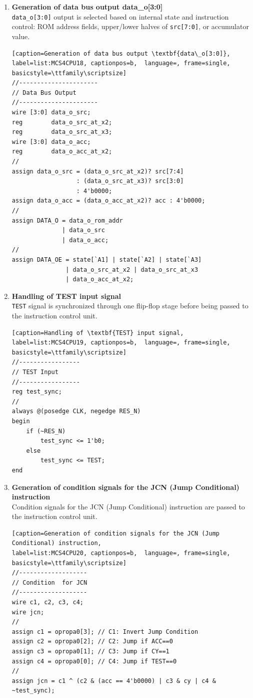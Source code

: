 \begin{enumerate}[(1)]
\item \textbf{Generation of data bus output \textbf{data\_o[3:0]}}\\
\verb|data_o[3:0]| output is selected based on internal state and instruction control: ROM address fields, upper/lower halves of \verb|src[7:0]|, or accumulator value.
\\
\begin{lstlisting}[caption=Generation of data bus output \textbf{data\_o[3:0]}, 
label=list:MCS4CPU18, captionpos=b,  language=, frame=single, basicstyle=\ttfamily\scriptsize]
//----------------------
// Data Bus Output
//----------------------
wire [3:0] data_o_src;
reg        data_o_src_at_x2;
reg        data_o_src_at_x3;
wire [3:0] data_o_acc;
reg        data_o_acc_at_x2;
//
assign data_o_src = (data_o_src_at_x2)? src[7:4]
                  : (data_o_src_at_x3)? src[3:0]
                  : 4'b0000;
assign data_o_acc = (data_o_acc_at_x2)? acc : 4'b0000;
//
assign DATA_O = data_o_rom_addr
              | data_o_src
              | data_o_acc;
//
assign DATA_OE = state[`A1] | state[`A2] | state[`A3]
               | data_o_src_at_x2 | data_o_src_at_x3
               | data_o_acc_at_x2;
\end{lstlisting}

\item \textbf{Handling of \textbf{TEST} input signal}\\
\verb|TEST| signal is synchronized through one flip-flop stage before being passed to the instruction control unit.
\\
\begin{lstlisting}[caption=Handling of \textbf{TEST} input signal, 
label=list:MCS4CPU19, captionpos=b,  language=, frame=single, basicstyle=\ttfamily\scriptsize]
//-----------------
// TEST Input
//-----------------
reg test_sync;
//
always @(posedge CLK, negedge RES_N)
begin
    if (~RES_N)
        test_sync <= 1'b0;
    else
        test_sync <= TEST;
end
\end{lstlisting}

\item \textbf{Generation of condition signals for the JCN (Jump Conditional) instruction}\\
Condition signals for the JCN (Jump Conditional) instruction are passed to the instruction control unit.
\\
\begin{lstlisting}[caption=Generation of condition signals for the JCN (Jump Conditional) instruction, 
label=list:MCS4CPU20, captionpos=b,  language=, frame=single, basicstyle=\ttfamily\scriptsize]
//-------------------
// Condition  for JCN
//-------------------
wire c1, c2, c3, c4;
wire jcn;
//
assign c1 = opropa0[3]; // C1: Invert Jump Condition
assign c2 = opropa0[2]; // C2: Jump if ACC==0
assign c3 = opropa0[1]; // C3: Jump if CY==1
assign c4 = opropa0[0]; // C4: Jump if TEST==0
//
assign jcn = c1 ^ (c2 & (acc == 4'b0000) | c3 & cy | c4 & ~test_sync);
\end{lstlisting}


\end{enumerate}
